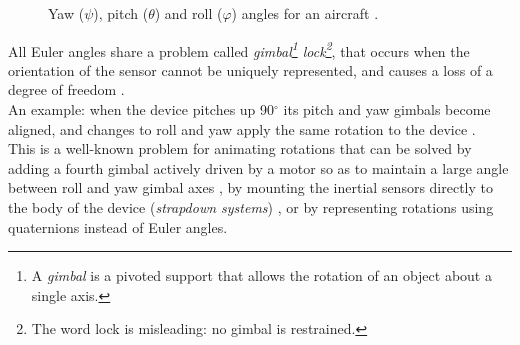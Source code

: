 \begin{center}
	\begin{figure}[ht]
		\caption{Yaw ($\psi$), pitch ($\theta$) and roll ($\varphi$) angles for an aircraft \cite{WikimediaPlane}.}
	\end{figure}
\end{center}

All Euler angles share a problem called \textit{gimbal\footnote{A \textit{gimbal} is a pivoted support that allows the rotation of an object about a single axis.} lock\footnote{The word lock is misleading: no gimbal is restrained.}}, that occurs when the orientation of the sensor cannot be uniquely represented, and causes a loss of a degree of freedom \cite{Dil18}.\\
An example: when the device pitches up 90$^{\circ}$ its pitch and yaw gimbals become aligned, and changes to roll and yaw apply the same rotation to the device \cite[68]{Tit04}.\\
This is a well-known problem for animating rotations that can be solved by adding a fourth gimbal actively driven by a motor so as to maintain a large angle between roll and yaw gimbal axes \cite{Bie99}, by mounting the inertial sensors directly to the body of the device (\textit{strapdown systems}) \cite[3]{Tit04}, or by representing rotations using quaternions instead of Euler angles.

